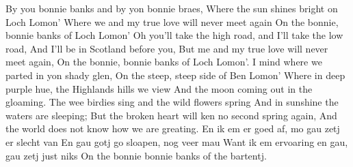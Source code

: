 \beginverse*
By you bonnie banks and by yon bonnie braes,
Where the sun shines bright on Loch Lomon’
Where we and my true love will never meet again
On the bonnie, bonnie banks of Loch Lomon’
\endverse
\beginchorus
Oh you’ll take the high road, and I’ll take the low road,
And I’ll be in Scotland before you,
But me and my true love will never meet again,
On the bonnie, bonnie banks of Loch Lomon’.
\endchorus
\beginverse*
I mind where we parted in yon shady glen,
On the steep, steep side of Ben Lomon’
Where in deep purple hue, the Highlands hills we view
And the moon coming out in the gloaming.
\endverse
\beginverse* 
The wee birdies sing and the wild flowers spring
And in sunshine the waters are sleeping;
But the broken heart will ken no second spring again,
And the world does not know how we are greating. 
\endverse
\beginverse*
En ik em er goed af, mo gau zetj er slecht van
En gau gotj go sloapen, nog veer mau
Want ik em ervoaring en gau, gau zetj just niks
On the bonnie bonnie banks of the bartentj.
\endverse
\endsong